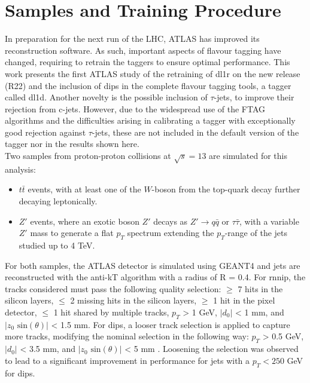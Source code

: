 \section{Samples and Training Procedure}
In preparation for the next run of the LHC, ATLAS has improved its reconstruction software. As such, important aspects of flavour tagging have changed, requiring to retrain the taggers to ensure optimal performance. This work presents the first ATLAS study of the retraining of \gls{dl1r} on the new release (R22) and the inclusion of \gls{dips} in the complete flavour tagging tools, a tagger called \gls{dl1d}. Another novelty is the possible inclusion of $\tau$-jets, to improve their rejection from c-jets. However, due to the widespread use of the FTAG algorithms and the difficulties arising in calibrating a tagger with exceptionally good rejection against $\tau$-jets, these are not included in the default version of the tagger nor in the results shown here.  \\ 

Two samples from proton-proton collisions at $\sqrt{s} = 13$ are simulated for this analysis:
\begin{itemize}
\item $t\bar{t}$ events, with at least one of the $W$-boson from the top-quark decay further decaying leptonically. 
\item $Z'$ events, where an exotic boson $Z'$ decays as $Z' \rightarrow q\bar{q} \textrm{ or } \tau \bar{\tau}$, with a variable $Z'$ mass to generate a flat $p_T$ spectrum extending the $p_T$-range of the jets studied up to 4 TeV.
\end{itemize}

For both samples, the ATLAS detector is simulated using GEANT4 \cite{Agostinelli:602040} and jets are reconstructed with the anti-kT algorithm with a radius of R = 0.4.  For \gls{rnnip}, the tracks considered must pass the following quality selection: $\geq$ 7 hits in the silicon layers, $\leq$ 2 missing hits in the silicon layers, $\geq$ 1 hit in the pixel detector, $\leq$ 1 hit shared by multiple tracks, $p_T$ > 1 GeV, $|d_0|$ < 1 mm, and $|z_0 \textrm{ sin}(\theta)|$ < 1.5 mm. For \gls{dips}, a looser track selection is applied to capture more tracks, modifying the nominal selection in the following way: $p_T$ > 0.5 GeV, $|d_0|$ < 3.5 mm, and $|z_0 \textrm{ sin}(\theta)|$ < 5 mm \cite{ATL-PHYS-PUB-2020-014}. Loosening the selection was observed to lead to a significant improvement in performance for jets with a $p_T < 250$ GeV for \gls{dips}. \\

